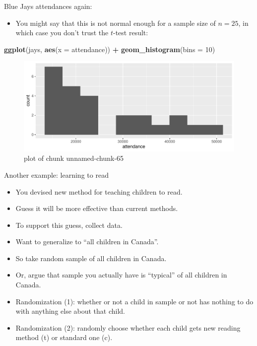 \documentclass[ignorenonframetext,]{beamer}
\newenvironment{Shaded}{\begin{snugshade}}{\end{snugshade}}
\newcommand{\DataTypeTok}[1]{\textcolor[rgb]{0.13,0.29,0.53}{#1}}
\newcommand{\DecValTok}[1]{\textcolor[rgb]{0.00,0.00,0.81}{#1}}
\newcommand{\KeywordTok}[1]{\textcolor[rgb]{0.13,0.29,0.53}{\textbf{#1}}}
\newcommand{\NormalTok}[1]{#1}
\newcommand{\OperatorTok}[1]{\textcolor[rgb]{0.81,0.36,0.00}{\textbf{#1}}}
\newcommand{\StringTok}[1]{\textcolor[rgb]{0.31,0.60,0.02}{#1}}
\providecommand{\tightlist}{%
  \setlength{\itemsep}{0pt}\setlength{\parskip}{0pt}}
\begin{document}
\begin{frame}[fragile]{Blue Jays attendances again:}
\protect\hypertarget{blue-jays-attendances-again}{}

\begin{itemize}
\tightlist
\item
  You might say that this is not normal enough for a sample size of
  \(n = 25\), in which case you don't trust the \(t\)-test result:
\end{itemize}

\begin{Shaded}
\begin{Highlighting}[]
\KeywordTok{ggplot}\NormalTok{(jays, }\KeywordTok{aes}\NormalTok{(}\DataTypeTok{x =}\NormalTok{ attendance)) }\OperatorTok{+}\StringTok{ }\KeywordTok{geom_histogram}\NormalTok{(}\DataTypeTok{bins =} \DecValTok{10}\NormalTok{)}
\end{Highlighting}
\end{Shaded}

\begin{figure}
\centering
\includegraphics{figure/unnamed-chunk-65-1.pdf}
\caption{plot of chunk unnamed-chunk-65}
\end{figure}

\end{frame}

\begin{frame}{Another example: learning to read}
\protect\hypertarget{another-example-learning-to-read}{}

\begin{itemize}
\tightlist
\item
  You devised new method for teaching children to read.
\item
  Guess it will be more effective than current methods.
\item
  To support this guess, collect data.
\item
  Want to generalize to ``all children in Canada''.
\item
  So take random sample of all children in Canada.
\item
  Or, argue that sample you actually have is ``typical'' of all children
  in Canada.
\item
  Randomization (1): whether or not a child in sample or not has nothing
  to do with anything else about that child.
\item
  Randomization (2): randomly choose whether each child gets new reading
  method (t) or standard one (c).
\end{itemize}

\end{frame}
\end{document}

